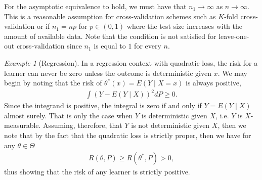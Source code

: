 \documentclass[11pt, a4paper]{article}
\theoremstyle{definition}
\theoremstyle{remark}
\newtheorem{example}{Example}
\newcommand{\q}{q}
\newcommand{\btheta}{\theta}
\begin{document}
For the asymptotic equivalence to hold, we must have that $ n_1 \to \infty $ as $ n \to \infty $. This is a reasonable assumption for cross-validation schemes such as $ K $-fold cross-validation or if $ n_1 = np $ for $ p \in (0,1) $ where the test size increases with the amount of available data. Note that the condition is not satisfied for leave-one-out cross-validation since $ n_1$ is equal to $ 1 $ for every $ n $.  
\begin{example}[Regression]
   In a regression context with quadratic loss, the risk for a learner can never be zero unless the outcome is deterministic given $ x $. We may begin by noting that the risk of $ \theta^*(x) = E(Y \mid X = x) $ is always positive,
   \begin{align*}
       \int (Y - E(Y \mid X))^2 d P \geq 0. 
   \end{align*}
   Since the integrand is positive, the integral is zero if and only if $ Y = E(Y \mid X) $ almost surely. That is only the case when $ Y $ is deterministic given $ X $, i.e. $ Y $ is $ X $-measurable. Assuming, therefore, that $ Y $ is not deterministic given $ X $, then we note that by the fact that the quadratic loss is strictly proper, then we have for any $ \theta \in \Theta $
   \begin{align*}
       R(\theta, P) \geq R(\theta^*, P) > 0,
   \end{align*}
    thus showing that the risk of any learner is strictly positive.
\end{example}



\end{document}
